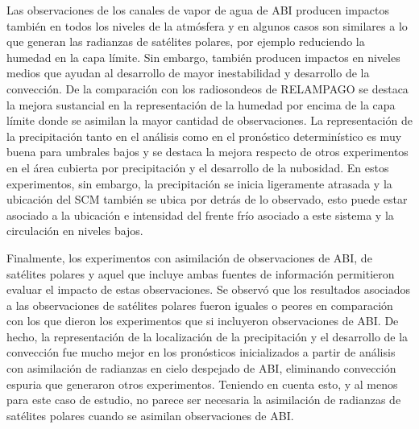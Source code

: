 \documentclass[12pt,oneside,a4paper]{reedthesis}
\begin{document}
Las observaciones de los canales de vapor de agua de ABI producen impactos también en todos los niveles de la atmósfera y en algunos casos son similares a lo que generan las radianzas de satélites polares, por ejemplo reduciendo la humedad en la capa límite. Sin embargo, también producen impactos en niveles medios que ayudan al desarrollo de mayor inestabilidad y desarrollo de la convección. De la comparación con los radiosondeos de RELAMPAGO se destaca la mejora sustancial en la representación de la humedad por encima de la capa límite donde se asimilan la mayor cantidad de observaciones. La representación de la precipitación tanto en el análisis como en el pronóstico determinístico es muy buena para umbrales bajos y se destaca la mejora respecto de otros experimentos en el área cubierta por precipitación y el desarrollo de la nubosidad. En estos experimentos, sin embargo, la precipitación se inicia ligeramente atrasada y la ubicación del SCM también se ubica por detrás de lo observado, esto puede estar asociado a la ubicación e intensidad del frente frío asociado a este sistema y la circulación en niveles bajos.

Finalmente, los experimentos con asimilación de observaciones de ABI, de satélites polares y aquel que incluye ambas fuentes de información permitieron evaluar el impacto de estas observaciones. Se observó que los resultados asociados a las observaciones de satélites polares fueron iguales o peores en comparación con los que dieron los experimentos que si incluyeron observaciones de ABI. De hecho, la representación de la localización de la precipitación y el desarrollo de la convección fue mucho mejor en los pronósticos inicializados a partir de análisis con asimilación de radianzas en cielo despejado de ABI, eliminando convección espuria que generaron otros experimentos. Teniendo en cuenta esto, y al menos para este caso de estudio, no parece ser necesaria la asimilación de radianzas de satélites polares cuando se asimilan observaciones de ABI.
\end{document}
